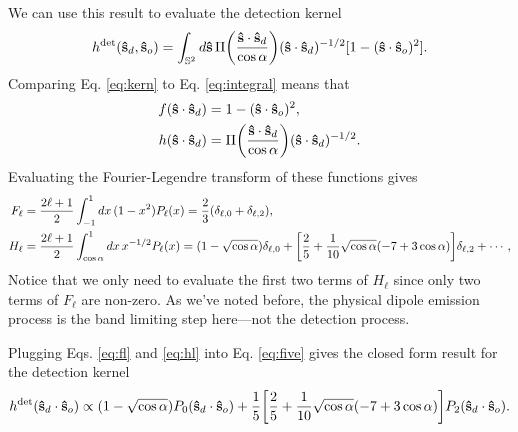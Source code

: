 \documentclass[11pt]{article}
\providecommand{\so}{\mathbf{\hat{s}}_o}
\providecommand{\sd}{\mathbf{\hat{s}}_d}
\providecommand{\mh}[1]{\mathbf{\hat{#1}}}
\providecommand{\mbb}[1]{\mathbb{#1}}
\providecommand{\ints}[1]{\int_{\mbb{S}^{#1}}}
\let\originalleft\left
\let\originalright\right
\renewcommand{\left}{\mathopen{}\mathclose\bgroup\originalleft}
\renewcommand{\right}{\aftergroup\egroup\originalright}
\begin{document}
We can use this result to evaluate the detection kernel
\begin{align}
  h^{\text{det}}(\sd,\so) = \ints{2}d\mh{s}\,\Pi\left(\frac{\mh{s}\cdot\sd}{\cos\alpha}\right)(\mh{s}\cdot\sd)^{-1/2}[1 - (\mh{s}\cdot\so)^2]. \label{eq:kern}
\end{align}
Comparing Eq. \eqref{eq:kern} to Eq. \eqref{eq:integral} means that
\begin{align}
  f(\mh{s}\cdot\sd) &= 1 - (\mh{s}\cdot\so)^2,  \\
  h(\mh{s}\cdot\sd) &= \Pi\left(\frac{\mh{s}\cdot\sd}{\cos\alpha}\right)(\mh{s}\cdot\sd)^{-1/2}.
\end{align}
Evaluating the Fourier-Legendre transform of these functions gives
\begin{align}
  F_\ell &= \frac{2\ell + 1}{2}\int_{-1}^1dx\,(1 - x^{2})P_\ell(x) = \frac{2}{3}(\delta_{\ell,0} + \delta_{\ell,2}),\label{eq:fl}\\
  H_\ell &= \frac{2\ell + 1}{2}\int_{\cos\alpha}^1dx\,x^{-1/2}P_\ell(x) = (1 - \sqrt{\cos\alpha})\delta_{\ell,0} + \left[\frac{2}{5} + \frac{1}{10}\sqrt{\cos\alpha}(-7+3\cos\alpha)\right]\delta_{\ell,2}+ \cdots,\label{eq:hl}
\end{align}
Notice that we only need to evaluate the first two terms of $H_\ell$ since
only two terms of $F_\ell$ are non-zero. As we've noted before, the physical
dipole emission process is the band limiting step here---not the detection
process.

Plugging Eqs. \eqref{eq:fl} and \eqref{eq:hl} into Eq. \eqref{eq:five} gives the
closed form result for the detection kernel
\begin{align}
  h^{\text{det}}(\sd\cdot\so) \propto (1 - \sqrt{\cos\alpha})P_0(\sd\cdot\so) + \frac{1}{5}\left[\frac{2}{5} + \frac{1}{10}\sqrt{\cos\alpha}(-7+3\cos\alpha)\right]P_2(\sd\cdot\so).
\end{align}
\end{document}
